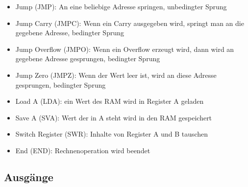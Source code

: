 \begin{itemize}
    \item Jump (JMP): An eine beliebige Adresse springen, unbedingter Sprung
    \item Jump Carry (JMPC): Wenn ein Carry ausgegeben wird, springt man an die gegebene Adresse, bedingter Sprung
    \item Jump Overflow (JMPO): Wenn ein Overflow erzeugt wird, dann wird an gegebene Adresse gesprungen, bedingter Sprung
    \item Jump Zero (JMPZ): Wenn der Wert leer ist, wird an diese Adresse gesprungen, bedingter Sprung
    \item Load A (LDA): ein Wert des RAM wird in Register A geladen
    \item Save A (SVA): Wert der in A steht wird in den RAM gespeichert
    \item Switch Register (SWR): Inhalte von Register A und B tauschen
    \item End (END): Rechnenoperation wird beendet
\end{itemize}


\subsection{Ausgänge}
\label{sec:ausgänge}